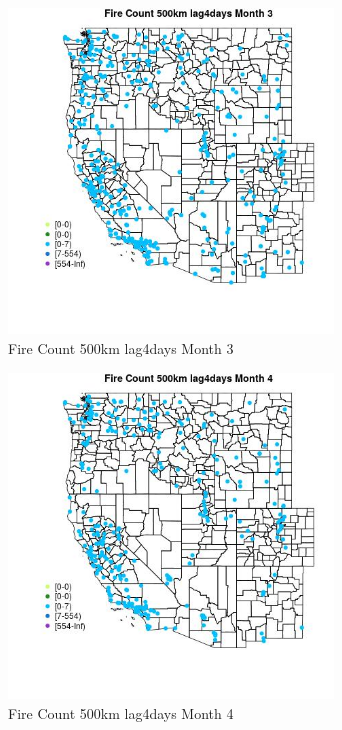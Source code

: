\begin{figure} 
\centering  
\includegraphics[width=0.77\textwidth]{Code_Outputs/Report_ML_input_PM25_Step4_part_e_de_duplicated_aves_compiled_2019-05-18wNAs_MapObsMo3Fire_Count_500km_lag4days.jpg} 
\caption{\label{fig:Report_ML_input_PM25_Step4_part_e_de_duplicated_aves_compiled_2019-05-18wNAsMapObsMo3Fire_Count_500km_lag4days}Fire Count 500km lag4days Month 3} 
\end{figure} 
 

\begin{figure} 
\centering  
\includegraphics[width=0.77\textwidth]{Code_Outputs/Report_ML_input_PM25_Step4_part_e_de_duplicated_aves_compiled_2019-05-18wNAs_MapObsMo4Fire_Count_500km_lag4days.jpg} 
\caption{\label{fig:Report_ML_input_PM25_Step4_part_e_de_duplicated_aves_compiled_2019-05-18wNAsMapObsMo4Fire_Count_500km_lag4days}Fire Count 500km lag4days Month 4} 
\end{figure} 
 

